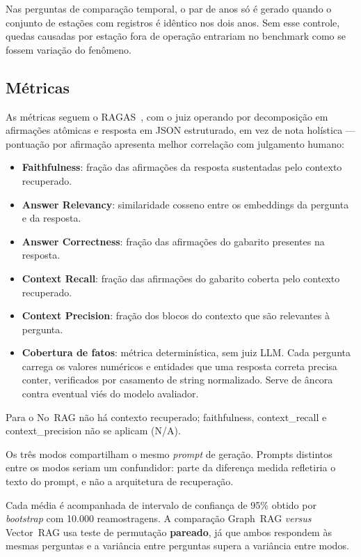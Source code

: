 \documentclass[conference]{IEEEtran}
\begin{document}
Nas perguntas de comparação temporal, o par de anos só é gerado quando
o conjunto de estações com registros é idêntico nos dois anos. Sem esse
controle, quedas causadas por estação fora de operação entrariam no
benchmark como se fossem variação do fenômeno.

\subsection{Métricas}

As métricas seguem o RAGAS~\cite{es2024ragas}, com o juiz operando por
decomposição em afirmações atômicas e resposta em JSON estruturado,
em vez de nota holística --- pontuação por afirmação apresenta melhor
correlação com julgamento humano:

\begin{itemize}
  \item \textbf{Faithfulness}: fração das afirmações da resposta
        sustentadas pelo contexto recuperado.
  \item \textbf{Answer Relevancy}: similaridade cosseno entre os
        embeddings da pergunta e da resposta.
  \item \textbf{Answer Correctness}: fração das afirmações do gabarito
        presentes na resposta.
  \item \textbf{Context Recall}: fração das afirmações do gabarito
        coberta pelo contexto recuperado.
  \item \textbf{Context Precision}: fração dos blocos do contexto que
        são relevantes à pergunta.
  \item \textbf{Cobertura de fatos}: métrica determinística, sem juiz
        LLM. Cada pergunta carrega os valores numéricos e entidades que
        uma resposta correta precisa conter, verificados por casamento
        de string normalizado. Serve de âncora contra eventual viés do
        modelo avaliador.
\end{itemize}

Para o No~RAG não há contexto recuperado; faithfulness,
context\_recall e context\_precision não se aplicam (N/A).

Os três modos compartilham o mesmo \textit{prompt} de geração. Prompts
distintos entre os modos seriam um confundidor: parte da diferença
medida refletiria o texto do prompt, e não a arquitetura de recuperação.

Cada média é acompanhada de intervalo de confiança de 95\% obtido por
\textit{bootstrap} com 10.000 reamostragens. A comparação
Graph~RAG {\itshape versus} Vector~RAG usa teste de permutação
\textbf{pareado}, já que ambos respondem às mesmas perguntas e a
variância entre perguntas supera a variância entre modos.
\end{document}
